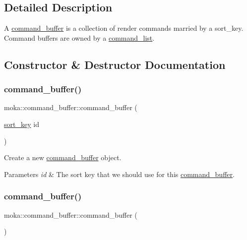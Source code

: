 \subsection{Detailed Description}
A \mbox{\hyperlink{classmoka_1_1command__buffer}{command\+\_\+buffer}} is a collection of render commands married by a sort\+\_\+key. Command buffers are owned by a \mbox{\hyperlink{classmoka_1_1command__list}{command\+\_\+list}}. 

\subsection{Constructor \& Destructor Documentation}
\mbox{\label{classmoka_1_1command__buffer_a8ed8ee9b65a14f30f249ca63e19ccb10}} 
\subsubsection{\texorpdfstring{command\_buffer()}{command\_buffer()}\hspace{0.1cm}{\footnotesize\ttfamily [1/4]}}
{\footnotesize\ttfamily moka\+::command\+\_\+buffer\+::command\+\_\+buffer (\begin{DoxyParamCaption}\item[{\mbox{\hyperlink{namespacemoka_afa30a616e67b83113ebdb857555cf2bb}{sort\+\_\+key}}}]{id }\end{DoxyParamCaption})\hspace{0.3cm}{\ttfamily [explicit]}}



Create a new \mbox{\hyperlink{classmoka_1_1command__buffer}{command\+\_\+buffer}} object. 


\begin{DoxyParams}{Parameters}
{\em id} & The sort key that we should use for this \mbox{\hyperlink{classmoka_1_1command__buffer}{command\+\_\+buffer}}. \\
\hline
\end{DoxyParams}
\mbox{\label{classmoka_1_1command__buffer_a911db965f8ff1133a8916a893dc4d663}} 
\subsubsection{\texorpdfstring{command\_buffer()}{command\_buffer()}\hspace{0.1cm}{\footnotesize\ttfamily [2/4]}}
{\footnotesize\ttfamily moka\+::command\+\_\+buffer\+::command\+\_\+buffer (\begin{DoxyParamCaption}{ }\end{DoxyParamCaption})\hspace{0.3cm}{\ttfamily [default]}}

